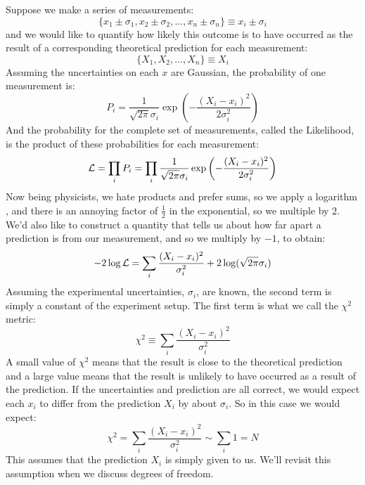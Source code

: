 \documentclass[12pt,oneside]{book}
\begin{document}
Suppose we make a series of measurements:
\begin{displaymath}
\{x_1 \pm \sigma_1, x_2 \pm \sigma_2, \ldots, x_n \pm \sigma_n \} \equiv x_i \pm \sigma_i
\end{displaymath}
and we would like to quantify how likely this outcome is to have occurred as the result of a corresponding theoretical prediction for each measurement:
\begin{displaymath}
\{X_1, X_2, \ldots, X_n \} \equiv X_i
\end{displaymath}
Assuming the uncertainties on each $x$ are Gaussian, the probability of one measurement is:
\begin{displaymath}
P_i = \frac{1}{\sqrt{2 \pi} \sigma_i}  \exp\left( - \frac{(X_i-x_i)^2}{2\sigma_i^2}\right)
\end{displaymath}
And the probability for the complete set of measurements, called the Likelihood, is the product of these probabilities for each measurement:
\begin{displaymath}
{\cal L} = \prod_i P_i = \prod_i \frac{1}{\sqrt{2 \pi} \sigma_i}  \exp\left( - \frac{(X_i-x_i)^2}{2\sigma_i^2}\right)
\end{displaymath}
Now being physicists, we hate products and prefer sums, so we apply a logarithm , and there is an annoying factor of $\frac{1}{2}$ in the exponential, so we multiple by 2.  We'd also like to construct a quantity that tells us about how far apart a prediction is from our measurement, and so we multiply by $-1$, to obtain:
\begin{equation}
-2 \log {\cal L} = \sum_i \frac{(X_i-x_i)^2}{\sigma_i^2} + 2 \log(\sqrt{2\pi}\sigma_i)
\end{equation}
Assuming the experimental uncertainties, $\sigma_i$, are known, the second term is simply a constant of the experiment setup.  The first term is what we call the $\chi^2$ metric:
\begin{equation}
\chi^2 \equiv \sum_i \frac{(X_i-x_i)^2}{\sigma_i^2} 
\end{equation}
A small value of $\chi^2$ means that the result is close to the theoretical prediction and a large value means that the result is unlikely to have occurred as a result of the prediction.  If the uncertainties and prediction are all correct, we would expect each $x_i$ to differ from the prediction $X_i$ by about $\sigma_i$.  So in this case we would expect:
\begin{equation}
\chi^2 = \sum_i \frac{(X_i-x_i)^2}{\sigma_i^2} \sim \sum_i 1 = N
\end{equation}
This assumes that the prediction $X_i$ is simply given to us.  We'll revisit this assumption when we discuss degrees of freedom.
\end{document}
